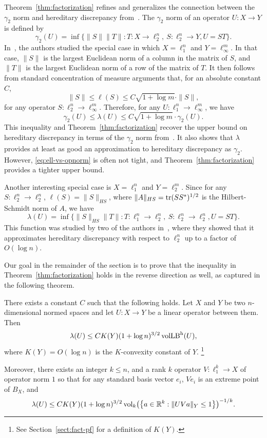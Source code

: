 Theorem~\ref{thm:factorization} refines and generalizes the connection
between the $\gamma_2$ norm and hereditary discrepancy
from~\cite{disc-gamma2}. The $\gamma_2$ norm of an operator $U:X \to
Y$ is defined by
\[
\gamma_2(U) = \inf\{\|S\| \|T\|:  T: X \to \ell_2^n,\ S: \ell_2^n
\to Y, U = ST\}.
\]
In~\cite{disc-gamma2}, the authors studied the special case in which
$X = \ell_1^n$ and $Y = \ell_\infty^m$. In that case, $\|S\|$ is the
largest Euclidean norm of a column in the matrix of $S$, and $\|T\|$
is the largest Euclidean norm of a row of the matrix of $T$. It then
follows from standard concentration of measure arguments that, for an absolute constant $C$,
\begin{equation}
  \label{eq:ell-vs-opnorm}
  \|S\| \le \ell(S) \le C\sqrt{1 + \log m} \cdot\|S\|,
\end{equation}
for any operator $S: \ell_2^n \to \ell_\infty^m$. Therefore,
for any $U:\ell_1^n \to \ell_\infty^m$, we have 
\[
\gamma_2(U) \le \lambda(U) \le C\sqrt{1 + \log m}\cdot \gamma_2(U).
\]
This inequality and Theorem~\ref{thm:factorization} recover the upper
bound on hereditary discrepancy in terms of the $\gamma_2$ norm
from~\cite{disc-gamma2}. It also shows that $\lambda$ provides at
least as good an approximation to hereditary discrepancy as $\gamma_2$.
However, \eqref{eq:ell-vs-opnorm} is often
not tight, and Theorem~\ref{thm:factorization} provides a tighter
upper bound.

Another interesting special case is $X = \ell_1^n$ and $Y =
\ell_2^m$. Since for any $S:\ell_2^n\to \ell_2^n$, $\ell(S) =
\|S\|_{HS}$, where $\|A\|_{HS} = \operatorname{tr}(SS^*)^{1/2}$ is the
Hilbert-Schmidt norm of $A$, we have
\[
\lambda(U) = \inf\{\|S\|_{HS}\|T\|: 
T: \ell_1^n \to \ell_2^n,\ S: \ell_2^n \to \ell_2^n, U = ST\}.
\]
This function was studied by two of the authors in~\cite{NT15}, where
they showed that it approximates hereditary discrepancy with respect
to $\ell_2^n$ up to a factor of $O(\log n)$. 

Our goal in the remainder of the section is to prove that the
inequality in Theorem~\ref{thm:factorization} holds in the reverse
direction as well, as captured in the following theorem.

\begin{theorem}\label{thm:fact-vollb}
  There exists a constant $C$ such that the following holds. Let $X$
  and $Y$ be two $n$-dimensional normed spaces and let $U:X \to Y$ be
  a linear operator between them.
  Then
  \[
  \lambda(U) \le C K(Y) (1 + \log n)^{3/2}\operatorname{volLB}^{\rm h}(U),
  \]
  where $K(Y) = O(\log n)$ is the $K$-convexity constant of $Y$.
  \footnote{See Section~\ref{sect:fact-pf} for a definition of
    $K(Y)$.}  
  
  Moreover, there exists an integer $k\le n$, and a rank $k$ operator
  $V:\ell_1^k\to X$ of operator norm $1$ so that for any standard
  basis vector $e_i$, $Ve_i$ is an extreme point of $B_X$, and
  \[
  \lambda(U) \le C K(Y) (1 + \log n)^{3/2}
  \operatorname{vol}_k\bigl(\left\{ a \in {\mathbb{R}}^k: \|UV a\|_Y \le 1 \right\}\bigr)^{-1/k}.
  \]
\end{theorem}

